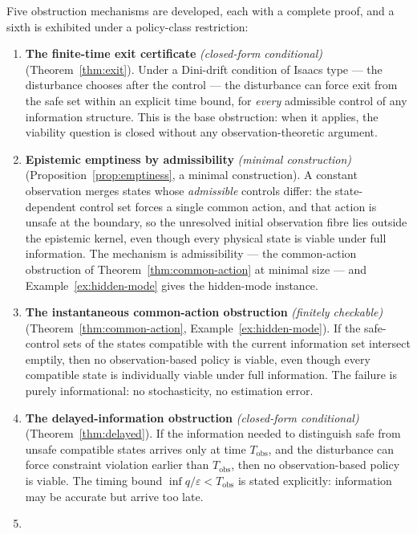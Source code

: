 \documentclass[10pt,twocolumn]{article}
\theoremstyle{definition}
\begin{document}
Five obstruction mechanisms are developed, each with a complete proof,
and a sixth is exhibited under a policy-class restriction:

\begin{enumerate}
\def\labelenumi{\arabic{enumi}.}
\item
  \textbf{The finite-time exit certificate} \emph{(closed-form conditional)} (Theorem~\ref{thm:exit}). Under a
  Dini-drift condition of Isaacs type --- the disturbance chooses after
  the control --- the disturbance can force exit from the safe set
  within an explicit time bound, for \emph{every} admissible control of
  any information structure. This is the base obstruction: when it
  applies, the viability question is closed without any
  observation-theoretic argument.
\item
  \textbf{Epistemic emptiness by admissibility} \emph{(minimal construction)} (Proposition~\ref{prop:emptiness}, a minimal
  construction). A constant observation merges states whose
  \emph{admissible} controls differ: the state-dependent control set
  forces a single common action, and that action is unsafe at the
  boundary, so the unresolved initial observation fibre lies outside the
  epistemic kernel, even though every physical state is viable under
  full information. The mechanism is admissibility --- the common-action
  obstruction of Theorem~\ref{thm:common-action} at minimal size --- and Example~\ref{ex:hidden-mode} gives the hidden-mode instance.
\item
  \textbf{The instantaneous common-action obstruction} \emph{(finitely checkable)} (Theorem~\ref{thm:common-action},
  Example~\ref{ex:hidden-mode}). If the safe-control sets of the states compatible with the
  current information set intersect emptily, then no observation-based
  policy is viable, even though every compatible state is individually
  viable under full information. The failure is purely informational: no
  stochasticity, no estimation error.
\item
  \textbf{The delayed-information obstruction} \emph{(closed-form conditional)} (Theorem~\ref{thm:delayed}). If the
  information needed to distinguish safe from unsafe compatible states
  arrives only at time \(T_{\mathrm{obs}}\), and the disturbance can
  force constraint violation earlier than \(T_{\mathrm{obs}}\), then no
  observation-based policy is viable. The timing bound
  \(\inf q / \varepsilon < T_{\mathrm{obs}}\) is stated explicitly:
  information may be accurate but arrive too late.
\item

\end{enumerate}
\end{document}
